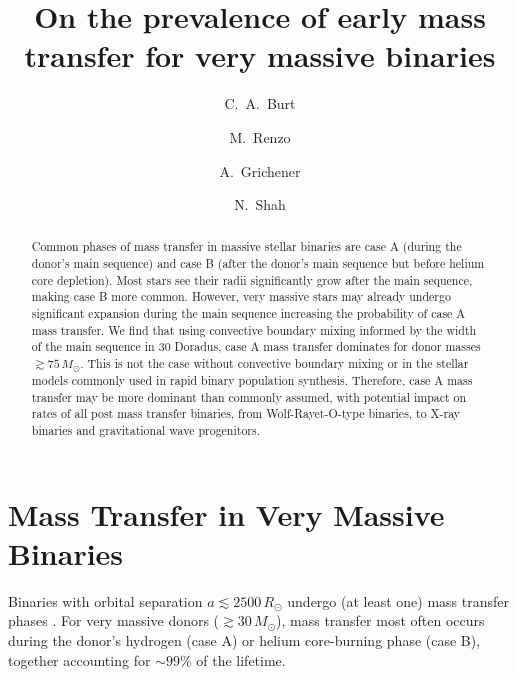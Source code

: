 \documentclass[twocolumn]{aastex631}
\begin{document}
\title{On the prevalence of early mass transfer for very massive binaries}

\author[0009-0008-2061-4946]{C.~A.~Burt}

\author[0000-0002-6718-9472]{M.~Renzo}

\author[0000-0002-2215-1841]{A.~Grichener}

\author[0000-0002-8465-8090]{N.~Shah}




\begin{abstract}
  Common phases of mass transfer in massive stellar binaries are case
  A (during the donor's main sequence) and case B (after the donor's
  main sequence but before helium core depletion). Most stars see
  their radii significantly grow after the main sequence, making case
  B more common. However, very massive stars may already undergo
  significant expansion during the main sequence increasing the
  probability of case A mass transfer. We find that using convective
  boundary mixing informed by the width of the main sequence in 30
  Doradus, case A mass transfer dominates for donor masses
  $\gtrsim 75 \, M_{\odot}$. This is not the case without convective
  boundary mixing or in the stellar models commonly used in rapid
  binary population synthesis. Therefore, case A mass transfer may be
  more dominant than commonly assumed, with potential impact on rates
  of all post mass transfer binaries, from Wolf-Rayet-O-type binaries,
  to X-ray binaries and gravitational wave progenitors.
\end{abstract}

\section{Mass Transfer in Very Massive Binaries}

Binaries with orbital separation $a\lesssim2500\,R_{\odot}$ undergo
(at least one) mass transfer phases \citep{sana:12}. For very massive
donors ($ \gtrsim 30 \, M_{\odot}$), mass transfer most often occurs
during the donor's hydrogen (case A) or helium core-burning phase
(case B), together accounting for $\sim99\%$ of the lifetime.
\end{document}
